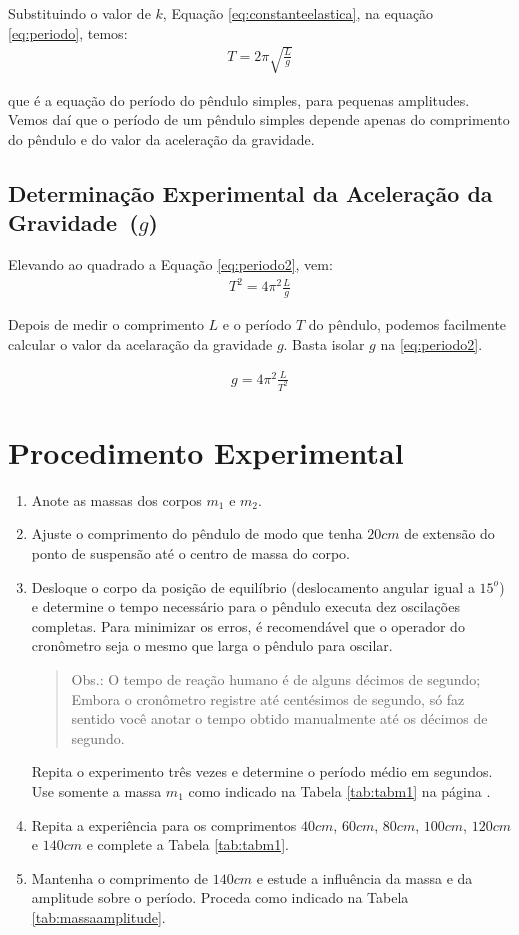 \documentclass[10pt,a4paper,onecolumn,notitlepage]{scrartcl}
\begin{document}
Substituindo o valor de $k$, Equação \ref{eq:constanteelastica}, na equação \ref{eq:periodo}, temos:
\begin{align}
T=2\pi\sqrt{\frac{L}{g}}
\label{eq:periodo2}
\end{align}

que é a equação do período do pêndulo simples, para pequenas amplitudes. Vemos daí que o período de um pêndulo simples depende apenas do comprimento do pêndulo e do valor da aceleração da gravidade.

\subsection{Determinação Experimental da Aceleração da Gravidade~($g$)}

Elevando ao quadrado a Equação \ref{eq:periodo2}, vem:
\begin{align}
T^2=4\pi^2\frac{L}{g}
\end{align}

Depois de medir o comprimento $L$ e o período $T$ do pêndulo, podemos facilmente calcular o valor da acelaração da gravidade $g$. Basta isolar $g$ na \ref{eq:periodo2}. 

\begin{align}
g=4\pi^2\frac{L}{T^2}
\label{eq:valordeg}
\end{align}

\section{Procedimento Experimental}
\begin{enumerate}
\item Anote as massas dos corpos $m_1$ e $m_2$.
\item Ajuste o comprimento do pêndulo de modo que tenha $20cm$ de extensão do ponto de suspensão até o centro de massa do corpo.
\item Desloque o corpo da posição de equilíbrio (deslocamento angular igual a $15^o$) e determine o tempo necessário para o pêndulo executa dez oscilações completas. Para minimizar os erros, é recomendável que o operador do cronômetro seja o mesmo que larga o pêndulo para oscilar.
\begin{quote}
Obs.: O tempo de reação humano é de alguns décimos de segundo; Embora o cronômetro registre até centésimos de segundo, só faz sentido você anotar o tempo obtido manualmente até os décimos de segundo.
\end{quote}
Repita o experimento três vezes e determine o período médio em segundos. Use somente a massa $m_1$ como indicado na Tabela \ref{tab:tabm1} na página \pageref{tab:tabm1}.

\item Repita a experiência para os comprimentos $40cm$, $60cm$, $80cm$, $100cm$, $120cm$ e $140cm$ e complete a Tabela \ref{tab:tabm1}.

\item Mantenha o comprimento de $140cm$ e estude a influência da massa e da amplitude sobre o período. Proceda como indicado na Tabela \ref{tab:massaamplitude}.

\end{enumerate}
\end{document}
